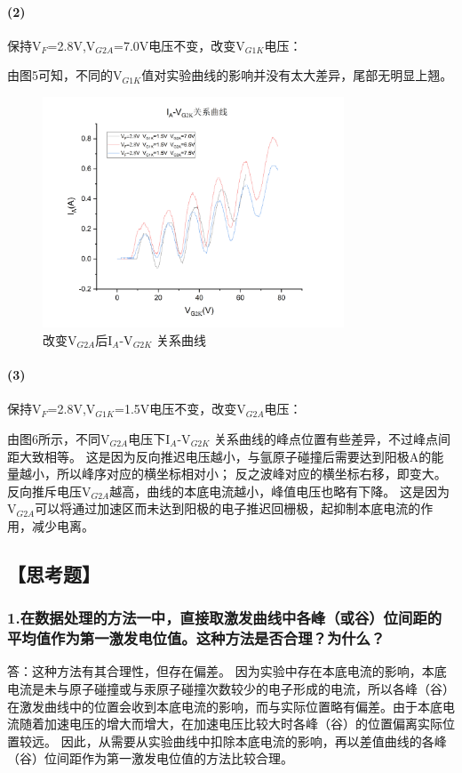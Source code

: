 \documentclass[12pt,a4paper,UTF8]{ctexart}
\begin{document}
	\paragraph*{(2)}
	保持V$_F$=2.8V,V$_{G2A}$=7.0V电压不变，改变V$_{G1K}$电压：

	由图5可知，不同的V$_{G1K}$值对实验曲线的影响并没有太大差异，尾部无明显上翘。

	\begin{figure}[htbp]
		\centering
		\includegraphics[width=0.8\textwidth]{img/4.3.png}
		\caption{改变V$_{G2A}$后I$_{A}$-V$_{G2K}$ 关系曲线}
	\end{figure}

	\paragraph*{(3)}
	保持V$_F$=2.8V,V$_{G1K}$=1.5V电压不变，改变V$_{G2A}$电压：

	由图6所示，不同V$_{G2A}$电压下I$_{A}$-V$_{G2K}$ 关系曲线的峰点位置有些差异，不过峰点间距大致相等。
	这是因为反向推迟电压越小，与氩原子碰撞后需要达到阳极A的能量越小，所以峰序对应的横坐标相对小；
	反之波峰对应的横坐标右移，即变大。
    反向推斥电压V$_{G2A}$越高，曲线的本底电流越小，峰值电压也略有下降。
    这是因为V$_{G2A}$可以将通过加速区而未达到阳极的电子推迟回栅极，起抑制本底电流的作用，减少电离。


\newpage

\subsection*{【思考题】}

	\subsubsection*{1.在数据处理的方法一中，直接取激发曲线中各峰（或谷）位间距的平均值作为第一激发电位值。这种方法是否合理？为什么？ }
	答：这种方法有其合理性，但存在偏差。
	因为实验中存在本底电流的影响，本底电流是未与原子碰撞或与汞原子碰撞次数较少的电子形成的电流，所以各峰（谷）在激发曲线中的位置会收到本底电流的影响，而与实际位置略有偏差。由于本底电流随着加速电压的增大而增大，在加速电压比较大时各峰（谷）的位置偏离实际位置较远。
	因此，从需要从实验曲线中扣除本底电流的影响，再以差值曲线的各峰（谷）位间距作为第一激发电位值的方法比较合理。
\end{document}
